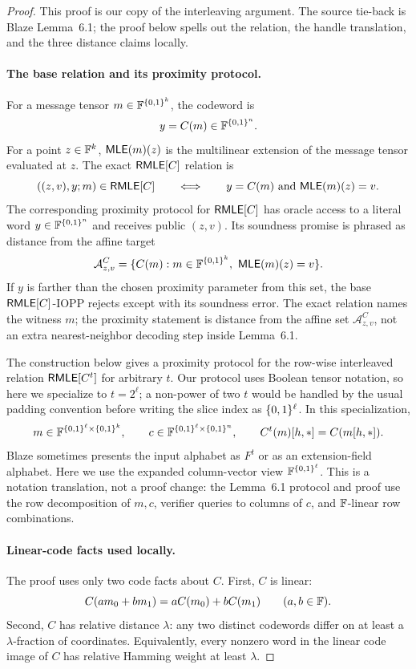 \begin{proof}
This proof is our copy of the interleaving argument.  The source tie-back is
Blaze Lemma~6.1; the proof below spells out the relation, the handle
translation, and the three distance claims locally.

\paragraph{The base relation and its proximity protocol.}
For a message tensor \(m\in\mathbb{F}^{\{0,1\}^k}\), the codeword is
\[
  y=C(m)\in\mathbb{F}^{\{0,1\}^n}.
\]
For a point \(z\in\mathbb{F}^k\), \(\mathsf{MLE}(m)(z)\) is the multilinear extension of the
message tensor evaluated at \(z\).  The exact \(\mathsf{RMLE}[C]\) relation is
\[
  ((z,v),y;m)\in\mathsf{RMLE}[C]
  \qquad\Longleftrightarrow\qquad
  y=C(m)\ \text{and}\ \mathsf{MLE}(m)(z)=v.
\]
The corresponding proximity protocol for \(\mathsf{RMLE}[C]\) has oracle access to a
literal word \(y\in\mathbb{F}^{\{0,1\}^n}\) and receives public \((z,v)\).  Its soundness
promise is phrased as distance from the affine target
\[
  \mathcal A^C_{z,v}
  =
  \{C(m):m\in\mathbb{F}^{\{0,1\}^k},\ \mathsf{MLE}(m)(z)=v\}.
\]
If \(y\) is farther than the chosen proximity parameter from this set, the base
\(\mathsf{RMLE}[C]\)-IOPP rejects except with its soundness error.  The exact relation
names the witness \(m\); the proximity statement is distance from the affine
set \(\mathcal A^C_{z,v}\), not an extra nearest-neighbor decoding step inside
Lemma~6.1.

The construction below gives a proximity protocol for the row-wise interleaved
relation \(\mathsf{RMLE}[C^t]\) for arbitrary \(t\).  Our protocol uses
Boolean tensor notation, so here we specialize to \(t=2^\ell\); a non-power of
two \(t\) would be handled by the usual padding convention before writing the
slice index as \(\{0,1\}^\ell\).  In this specialization,
\[
  m\in\mathbb{F}^{\{0,1\}^\ell\times\{0,1\}^k},
  \qquad
  c\in\mathbb{F}^{\{0,1\}^\ell\times\{0,1\}^n},
  \qquad
  C^t(m)[h,\ast]=C(m[h,\ast]).
\]
Blaze sometimes presents the input alphabet as \(F^t\) or as an extension-field
alphabet.  Here we use the expanded column-vector view
\(\mathbb{F}^{\{0,1\}^\ell}\).  This is a notation translation, not a proof change: the
Lemma~6.1 protocol and proof use the row decomposition of \(m,c\), verifier
queries to columns of \(c\), and \(\mathbb{F}\)-linear row combinations.

\paragraph{Linear-code facts used locally.}
The proof uses only two code facts about \(C\).  First, \(C\) is linear:
\[
  C(a m_0+b m_1)=aC(m_0)+bC(m_1)
  \qquad(a,b\in\mathbb{F}).
\]
Second, \(C\) has relative distance \(\lambda\): any two distinct codewords
differ on at least a \(\lambda\)-fraction of coordinates.  Equivalently, every
nonzero word in the linear code image of \(C\) has relative Hamming weight at
least \(\lambda\).


\end{proof}
